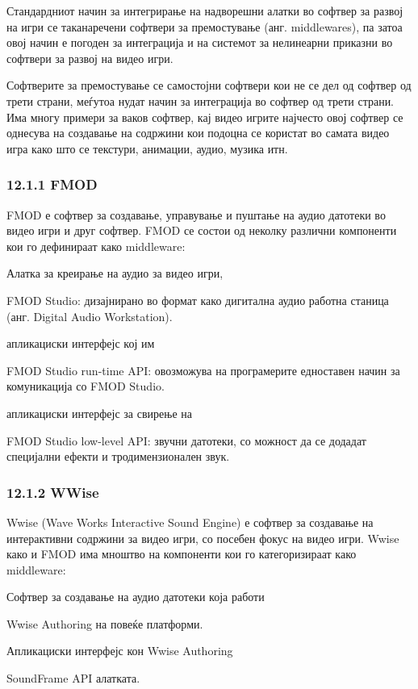 Стандардниот начин за интегрирање на надворешни алатки во софтвер за развој на игри се таканаречени софтвери за премостување (анг. middlewares), па затоа овој начин е погоден за интеграција и на системот за нелинеарни приказни во софтвери за развој на видео игри.

Софтверите за премостување се самостојни софтвери кои не се дел од софтвер од трети страни, меѓутоа нудат начин за интеграција во софтвер од трети страни. Има многу примери за ваков софтвер, кај видео игрите најчесто овој софтвер се однесува на создавање на содржини кои подоцна се користат во самата видео игра како што се текстури, анимации, аудио, музика итн.

\subsubsection{12.1.1 FMOD}

FMOD е софтвер за создавање, управување и пуштање на аудио датотеки во видео игри и друг софтвер. FMOD се состои од неколку различни компоненти кои го дефинираат како middleware:

Алатка за креирање на аудио за видео игри,

FMOD Studio: дизајнирано во формат како дигитална аудио работна станица (анг. Digital Audio Workstation).

апликациски интерфејс кој им

FMOD Studio run-time API: овозможува на програмерите едноставен начин за комуникација со FMOD Studio.

апликациски интерфејс за свирење на

FMOD Studio low-level API: звучни датотеки, со можност да се додадат специјални ефекти и тродимензионален звук.

\subsubsection{12.1.2 WWise}

Wwise (Wave Works Interactive Sound Engine) е софтвер за создавање на интерактивни содржини за видео игри, со посебен фокус на видео игри. Wwise како и FMOD има мноштво на компоненти кои го категоризираат како middleware:

Софтвер за создавање на аудио датотеки која работи

Wwise Authoring на повеќе платформи.

Апликациски интерфејс кон Wwise Authoring

SoundFrame API алатката.

